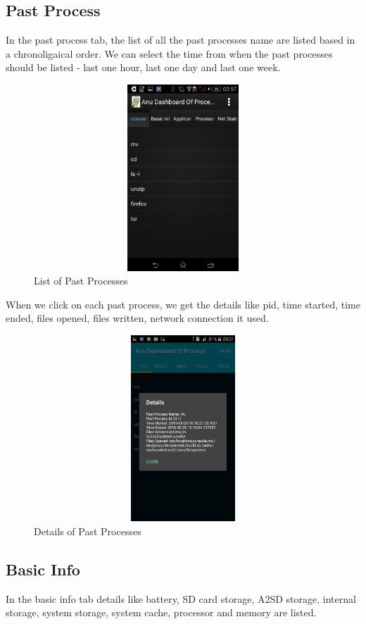 \documentclass[12pt]{report}
\begin{document}
\subsection{Past Process}
In the past process tab, the list of all the past processes name are listed based in a chronoligaical order. We can select the time from when the past processes should be listed - last one hour, last one day and last one week.
\begin{figure}[H]
	\centering
	\includegraphics[width=1.0\textwidth,width=5cm,height=7cm]{past_process_list}
	\caption{List of Past Processes}
	\end{figure}
	When we click on each past process, we get the details like pid, time started, time ended, files opened, files written, network connection it used. 
	\begin{figure}[H]
		\centering
		\includegraphics[width=1.0\textwidth,width=5cm,height=7cm]{past}
		\caption{Details of Past Processes}
	\end{figure}
\subsection{Basic Info}
In the basic info tab details like battery, SD card storage, A2SD storage, internal storage, system storage, system cache, processor and memory are listed.
 
\end{document}
